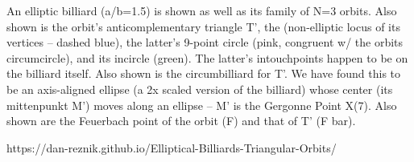 An elliptic billiard (a/b=1.5) is shown as well as its family of N=3 orbits. Also shown is the orbit's anticomplementary triangle T', the (non-elliptic locus of its vertices -- dashed blue), the latter's 9-point circle (pink, congruent w/ the orbits circumcircle), and its incircle (green). The latter's intouchpoints happen to be on the billiard itself. Also shown is the circumbilliard for T'. We have found this to be an axis-aligned ellipse (a 2x scaled version of the billiard) whose center (its mittenpunkt M') moves along an ellipse -- M' is the Gergonne Point X(7). Also shown are the Feuerbach point of the orbit (F) and that of T' (F bar).

https://dan-reznik.github.io/Elliptical-Billiards-Triangular-Orbits/